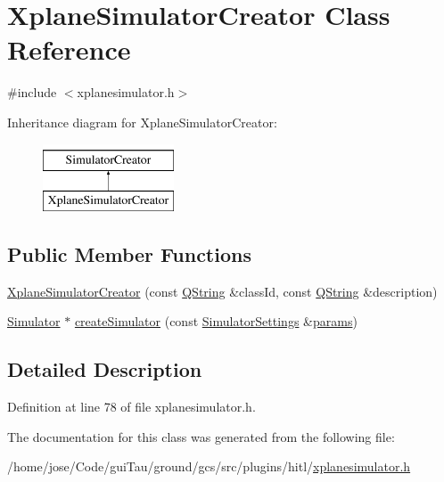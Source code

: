 \hypertarget{class_xplane_simulator_creator}{\section{Xplane\-Simulator\-Creator Class Reference}
\label{class_xplane_simulator_creator}
}


{\ttfamily \#include $<$xplanesimulator.\-h$>$}

Inheritance diagram for Xplane\-Simulator\-Creator\-:\begin{figure}[H]
\begin{center}
\leavevmode
\includegraphics[height=2.000000cm]{class_xplane_simulator_creator}
\end{center}
\end{figure}
\subsection*{Public Member Functions}
\begin{DoxyCompactItemize}
\item 
\hyperlink{group__hitlplugin_gab847bc2dd23d56e8783386fbfacb21ef}{Xplane\-Simulator\-Creator} (const \hyperlink{group___u_a_v_objects_plugin_gab9d252f49c333c94a72f97ce3105a32d}{Q\-String} \&class\-Id, const \hyperlink{group___u_a_v_objects_plugin_gab9d252f49c333c94a72f97ce3105a32d}{Q\-String} \&description)
\item 
\hyperlink{class_simulator}{Simulator} $\ast$ \hyperlink{group__hitlplugin_gaf7cd7c69acb5effb7d06e7e9236b4a95}{create\-Simulator} (const \hyperlink{group___h_i_t_l_plugin_ga052199f1328d3002bce3e45345aa7f4e}{Simulator\-Settings} \&\hyperlink{glext_8h_afeb6390ab3bc8a0e96a88aff34d52288}{params})
\end{DoxyCompactItemize}


\subsection{Detailed Description}


Definition at line 78 of file xplanesimulator.\-h.



The documentation for this class was generated from the following file\-:\begin{DoxyCompactItemize}
\item 
/home/jose/\-Code/gui\-Tau/ground/gcs/src/plugins/hitl/\hyperlink{xplanesimulator_8h}{xplanesimulator.\-h}\end{DoxyCompactItemize}
